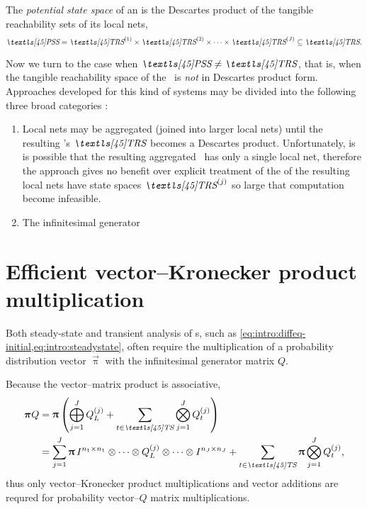 \fbreak

\begin{dfn}
  The \emph{potential state space} of an \sgspn is the Descartes
  product of the tangible reachability sets of its local nets,
  \begin{equation}
    \PSS = \TRS\loc{1} \times \TRS\loc{2} \times \cdots \times
    \TRS\loc{J} \subseteq \TRS \text.
  \end{equation}
\end{dfn}

Now we turn to the case when $\PSS \ne \TRS$, that is, when the
tangible reachability space of the \sgspn\ is \emph{not} in Descartes
product form. Approaches developed for this kind of systems may be
divided into the following three broad categories
\citet{DBLP:conf/ipps/BenoitPS03}:
\begin{enumerate}
\item Local nets may be aggregated (joined into larger local nets)
  until the resulting \sgspn's $\TRS$ becomes a Descartes
  product. Unfortunately, is is possible that the resulting aggregated
  \sgspn\ has only a single local net, therefore the approach gives no
  benefit over explicit treatment of the \gspn of the resulting local
  nets have state spaces $\TRS\loc{j}$ so large that computation
  become infeasible.
\item The infinitesimal generator 
\end{enumerate}

\section{Efficient vector--Kronecker product multiplication}

Both steady-state and transient analysis of \ctmc s, such as
\vref{eq:intro:diffeq-initial,eq:intro:steadystate}, often require the
multiplication of a probability distribution vector $\vec{\uppi}$ with
the infinitesimal generator matrix $Q$.

Because the vector--matrix product is associative,
\begin{align}
  \vec{\pi} Q &= \vec{\uppi} \, \mleft( \bigoplus_{j = 1}^J Q_L\loc{j}
                + \sum_{t \in \TS} \bigotimes_{j = 1}^J Q_t\loc{j}
                \mright) \\
              &= \sum_{j = 1}^J \vec{\uppi} \, I^{n_1 \times n_1} \otimes
                \cdots \otimes Q_L\loc{j} \otimes \cdots \otimes
                I^{n_J \times n_J} + \sum_{t \in \TS} \vec{\uppi}
                \bigotimes_{j = 1}^J Q_t\loc{j} \text,
\end{align}
thus only vector--Kronecker product multiplications and vector
additions are requred for probability vector--$Q$ matrix
multiplications.

